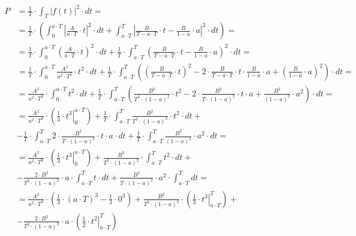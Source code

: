 \begin{task}
\begin{align*}
P&=\frac{1}{T} \cdot \int_{T}^{}\left|f(t)\right|^2 \cdot dt=\\
 &=\frac{1}{T} \cdot \left( \int_{0}^{a \cdot T}\left|\frac{A}{a \cdot T}\cdot t \right|^2 \cdot dt
  +\int_{a \cdot T}^{T}\left|\frac{B}{T - a \cdot T}\cdot t - \frac{B}{1 - a} \cdot a\right|^2 \cdot dt \right)=\\ 
 &=\frac{1}{T} \cdot \int_{0}^{a \cdot T}\left(\frac{A}{a \cdot T}\cdot t \right)^2 \cdot dt
  +\frac{1}{T} \cdot \int_{a \cdot T}^{T}\left(\frac{B}{T - a \cdot T}\cdot t - \frac{B}{1 - a} \cdot a\right)^2 \cdot dt=\\ 
 &=\frac{1}{T} \cdot \int_{0}^{a \cdot T}\frac{A^2}{a^2 \cdot T^2}\cdot t^2 \cdot dt
 +\frac{1}{T} \cdot \int_{a \cdot T}^{T}\left(\left(\frac{B}{T - a \cdot T}\cdot t\right)^2 - 2\cdot \frac{B}{T - a \cdot T}\cdot t \cdot  \frac{B}{1 - a} \cdot a + \left( \frac{B}{1 - a} \cdot a\right)^2 \right) \cdot dt=\\
 &=\frac{A^2}{a^2 \cdot T^3}\cdot \int_{0}^{a \cdot T} t^2 \cdot dt
 +\frac{1}{T} \cdot \int_{a \cdot T}^{T}\left(\frac{B^2}{T^2 \cdot \left(1 - a \right)^2}\cdot t^2 - 2\cdot \frac{B^2}{T\cdot \left(1 - a\right)^2}\cdot t \cdot a + \frac{B^2}{\left(1 - a \right)^2} \cdot a^2 \right) \cdot dt=\\
 &=\frac{A^2}{a^2 \cdot T^3}\cdot \left(\left. \frac{1}{3}\cdot t^3 \right|_{0}^{a \cdot T} \right)
 +\frac{1}{T} \cdot \int_{a \cdot T}^{T} \frac{B^2}{T^2 \cdot \left(1 - a \right)^2}\cdot t^2 \cdot dt +\\
 &- \frac{1}{T} \cdot \int_{a \cdot T}^{T} 2\cdot \frac{B^2}{T\cdot \left(1 - a\right)^2}\cdot t \cdot a \cdot dt + \frac{1}{T} \cdot \int_{a \cdot T}^{T} \frac{B^2}{\left(1 - a \right)^2} \cdot a^2 \cdot dt=\\ 
 &=\frac{A^2}{a^2 \cdot T^3}\cdot \left(\left. \frac{1}{3}\cdot t^3 \right|_{0}^{a \cdot T} \right)
 +\frac{B^2}{T^3 \cdot \left(1 - a \right)^2}\cdot \int_{a \cdot T}^{T}  t^2 \cdot dt +\\
 &- \frac{2\cdot B^2}{T^2 \cdot \left(1 - a\right)^2}\cdot a \cdot \int_{a \cdot T}^{T} t \cdot dt 
 + \frac{B^2}{T \cdot \left(1 - a \right)^2} \cdot a^2 \cdot \int_{a \cdot T}^{T} dt=\\
 &=\frac{A^2}{a^2 \cdot T^3}\cdot \left(\frac{1}{3}\cdot \left(a \cdot T\right)^3 - \frac{1}{3}\cdot 0^3 \right)
 +\frac{B^2}{T^3 \cdot \left(1 - a \right)^2}\cdot \left( \left. \frac{1}{3} \cdot t^3 \right|_{a \cdot T}^{T} \right) +\\
 &- \frac{2\cdot B^2}{T^2 \cdot \left(1 - a\right)^2}\cdot a \cdot \left( \left. \frac{1}{2} \cdot t^2 \right|_{a \cdot T}^{T} \right)

\end{align*}
\end{task}
